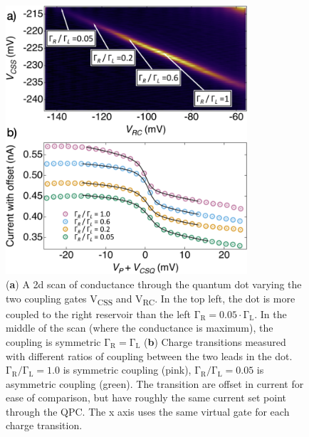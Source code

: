 \begin{figure}[!bht]
  \begin{center}
    \includegraphics[width=0.8\textwidth]{figures/ch3/crop_FiguresMaster.018.png}
    \caption[Conductance vs. Occupation : Picking locations of varying coupling symmetry]{\label{fig:ch3/symmetry_picking} 
     (\textbf{a}) A 2d scan of conductance through the quantum dot varying the two coupling gates V\textsubscript{CSS} and V\textsubscript{RC}. In the top left, the dot is more coupled to the right reservoir than the left $\mathrm{\Gamma_R} = 0.05\cdot\mathrm{\Gamma_L}$. In the middle of the scan (where the conductance is maximum), the coupling is symmetric $\mathrm{\Gamma_R} = \mathrm{\Gamma_L}$ (\textbf{b}) Charge transitions measured with different ratios of coupling between the two leads in the dot. $\mathrm{\Gamma_R/\Gamma_L} = 1.0$ is symmetric coupling (pink), $\mathrm{\Gamma_R/\Gamma_L} = 0.05$ is asymmetric coupling (green). The transition are offset in current for ease of comparison, but have roughly the same current set point through the QPC. The x axis uses the same virtual gate for each charge transition. 
    }
  \end{center}
\end{figure}


